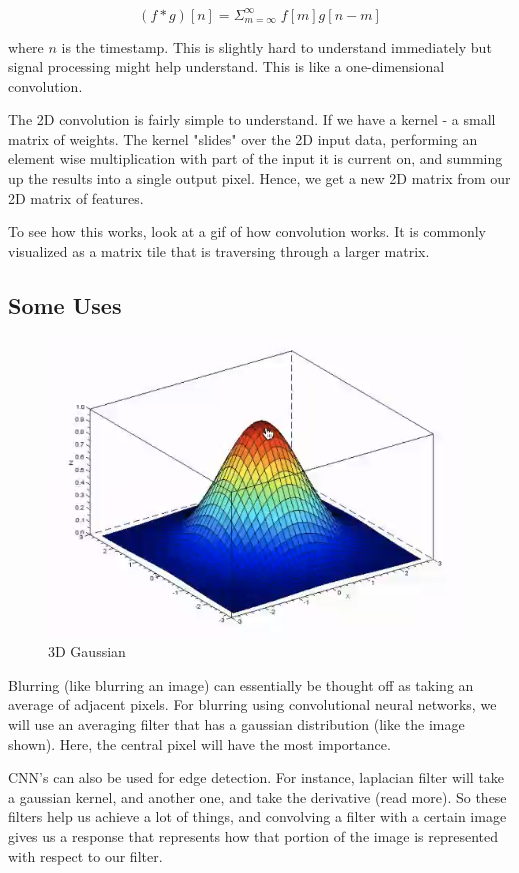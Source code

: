 \begin{equation}
    (f * g)[n] = \Sigma_{m= \infty}^{\infty} \; f[m]g[n-m]
\end{equation}

where $n$ is the timestamp. This is slightly hard to understand immediately but signal processing might help understand. This is like a one-dimensional convolution.

The 2D convolution is fairly simple to understand. If we have a kernel - a small matrix of weights. The kernel "slides" over the 2D input data, performing an element wise multiplication with part of the input it is current on, and summing up the results into a single output pixel. Hence, we get a new 2D matrix from our 2D matrix of features.

To see how this works, look at a gif of how convolution works. It is commonly visualized as a matrix tile that is traversing through a larger matrix.

\subsection{Some Uses}

\begin{figure}[h]
    \centering
    \includegraphics{img/3d-gaussian.png}
    \caption{3D Gaussian}
    \label{fig:my_label}
\end{figure}

Blurring (like blurring an image) can essentially be thought off as taking an average of adjacent pixels. For blurring using convolutional neural networks, we will use an averaging filter that has a gaussian distribution (like the image shown). Here, the central pixel will have the most importance. 

CNN's can also be used for edge detection. For instance, laplacian filter will take a gaussian kernel, and another one, and take the derivative (read more). So these filters help us achieve a lot of things, and convolving a filter with a certain image gives us a response that represents how that portion of the image is represented with respect to our filter.

